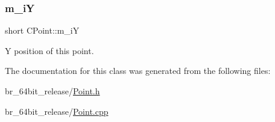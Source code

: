\subsubsection{\texorpdfstring{m\_iY}{m\_iY}}
{\footnotesize\ttfamily short C\+Point\+::m\+\_\+iY\hspace{0.3cm}{\ttfamily [protected]}}



Y position of this point. 



The documentation for this class was generated from the following files\+:\begin{DoxyCompactItemize}
\item 
br\+\_\+64bit\+\_\+release/\mbox{\hyperlink{Point_8h}{Point.\+h}}\item 
br\+\_\+64bit\+\_\+release/\mbox{\hyperlink{Point_8cpp}{Point.\+cpp}}\end{DoxyCompactItemize}
